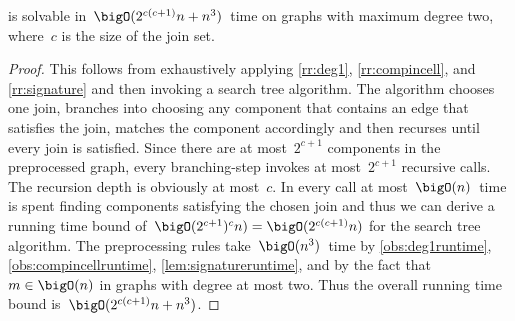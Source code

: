 \begin{lemma}\label{lem:cbmmaxdeg2tractable}
  \pCBMs{} is solvable in~$\bigO(2^{c(c+1)}n + n^3)$~time on graphs with maximum degree two, where~$c$ is the size of the join set.
\end{lemma}
\begin{proof}
  This follows from exhaustively applying \autoref{rr:deg1}, \autoref{rr:compincell}, and \autoref{rr:signature} and then invoking a search tree algorithm. The algorithm chooses one join, branches into choosing any component that contains an edge that satisfies the join, matches the component accordingly and then recurses until every join is satisfied. Since there are at most~$2^{c+1}$ components in the preprocessed graph, every branching-step invokes at most~$2^{c+1}$ recursive calls. The recursion depth is obviously at most~$c$. In every call at most~$\bigO(n)$~time is spent finding components satisfying the chosen join and thus we can derive a running time bound of~$\bigO(2^{c+1})^cn) = \bigO(2^{c(c+1)}n)$ for the search tree algorithm. The preprocessing rules take~$\bigO(n^3)$~time by \autoref{obs:deg1runtime}, \autoref{obs:compincellruntime}, \autoref{lem:signatureruntime}, and by the fact that~$m \in \bigO(n)$ in graphs with degree at most two. Thus the overall running time bound is~$\bigO(2^{c(c+1)}n + n^3)$.
\end{proof}
